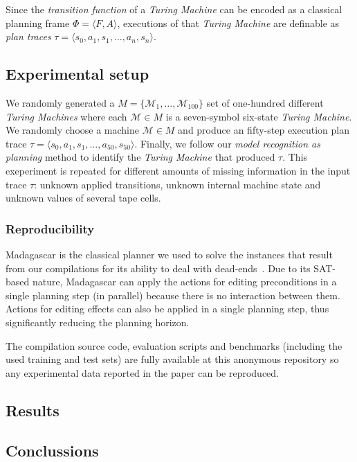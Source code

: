\documentclass[letterpaper]{article} %
\newcommand{\tup}[1]{{\langle #1 \rangle}}
\begin{document}
Since the {\em transition function} of a {\em Turing Machine} can be encoded as a classical planning frame $\Phi=\tup{F,A}$, executions of that {\em Turing Machine} are definable as {\em plan traces} $\tau=\tup{s_0,a_1,s_1,\ldots,a_n,s_n}$. 

\subsection{Experimental setup}
We randomly generated a $M=\{\mathcal{M}_1,\ldots,\mathcal{M}_{100}\}$ set of one-hundred different {\em Turing Machines} where each $\mathcal{M}\in M$ is a seven-symbol six-state {\em Turing Machine}. We randomly choose a machine $\mathcal{M}\in M$ and produce an fifty-step execution plan trace $\tau=\tup{s_0,a_1,s_1,\ldots,a_{50},s_{50}}$. Finally, we follow our {\em model recognition as planning} method to identify the {\em Turing Machine} that produced $\tau$. This exeperiment is repeated for different amounts of missing information in the input trace $\tau$: unknown applied transitions, unknown internal machine state and unknown values of several tape cells.

\subsubsection{Reproducibility}
{\sc Madagascar} is the classical planner we used to solve the instances that result from our compilations for its ability to deal with dead-ends~\cite{rintanen2014madagascar}. Due to its SAT-based nature, {\sc Madagascar} can apply the actions for editing preconditions in a single planning step (in parallel) because there is no interaction between them. Actions for editing effects can also be applied in a single planning step, thus significantly reducing the planning horizon.

The compilation source code, evaluation scripts and benchmarks (including the used training and test sets) are fully available at this anonymous repository {\em } so any experimental data reported in the paper can be reproduced.

\subsection{Results}

\subsection{Conclussions}
\label{sec:conclussions}





\end{document}
